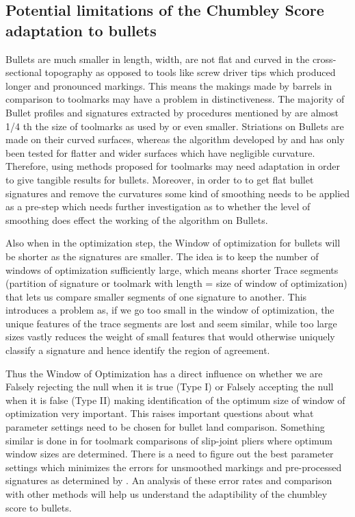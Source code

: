 \documentclass[12pt]{article}
\begin{document}
\subsection{Potential limitations of the Chumbley Score adaptation to
bullets}\label{potential-limitations-of-the-chumbley-score-adaptation-to-bullets}

Bullets are much smaller in length, width, are not flat and curved in
the cross-sectional topography as opposed to tools like screw driver
tips which produced longer and pronounced markings. This means the
makings made by barrels in comparison to toolmarks may have a problem in
distinctiveness. The majority of Bullet profiles and signatures
extracted by procedures mentioned by \citet{aoas} are almost 1/4 th the
size of toolmarks as used by \citet{chumbley} or even smaller.
Striations on Bullets are made on their curved surfaces, whereas the
algorithm developed by \citet{chumbley} and \citet{hadler} has only been
tested for flatter and wider surfaces which have negligible curvature.
Therefore, using methods proposed for toolmarks may need adaptation in
order to give tangible results for bullets. Moreover, in order to to get
flat bullet signatures and remove the curvatures some kind of smoothing
needs to be applied as a pre-step which needs further investigation as
to whether the level of smoothing does effect the working of the
algorithm on Bullets.

Also when in the optimization step, the Window of optimization for
bullets will be shorter as the signatures are smaller. The idea is to
keep the number of windows of optimization sufficiently large, which
means shorter Trace segments (partition of signature or toolmark with
length = size of window of optimization) that lets us compare smaller
segments of one signature to another. This introduces a problem as, if
we go too small in the window of optimization, the unique features of
the trace segments are lost and seem similar, while too large sizes
vastly reduces the weight of small features that would otherwise
uniquely classify a signature and hence identify the region of
agreement.

Thus the Window of Optimization has a direct influence on whether we are
Falsely rejecting the null when it is true (Type I) or Falsely accepting
the null when it is false (Type II) making identification of the optimum
size of window of optimization very important. This raises important
questions about what parameter settings need to be chosen for bullet
land comparison. Something similar is done in \citet{afte-chumbley} for
toolmark comparisons of slip-joint pliers where optimum window sizes are
determined. There is a need to figure out the best parameter settings
which minimizes the errors for unsmoothed markings and pre-processed
signatures as determined by \citet{aoas}. An analysis of these error
rates and comparison with other methods will help us understand the
adaptibility of the chumbley score to bullets.
\end{document}
